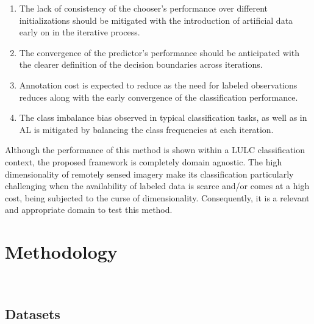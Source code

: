 \documentclass[parskip=full]{scrartcl}
\begin{document}
\begin{enumerate}
    \item The lack of consistency of the chooser's performance over different initializations should
        be mitigated with the introduction of artificial data early on in the iterative process.
    \item The convergence of the predictor's performance should be anticipated with the clearer
        definition of the decision boundaries across iterations.
    \item Annotation cost is expected to reduce as the need for labeled observations reduces along
        with the early convergence of the classification performance.
    \item The class imbalance bias observed in typical classification tasks, as well as in AL is
        mitigated by balancing the class frequencies at each iteration.
\end{enumerate}

Although the performance of this method is shown within a LULC classification context, the proposed
framework is completely domain agnostic. The high dimensionality of remotely sensed imagery make its
classification particularly challenging when the availability of labeled data is scarce and/or comes
at a high cost, being subjected to the curse of dimensionality. Consequently, it is a relevant and
appropriate domain to test this method.

\section{Methodology}~\label{sec:methodology}

\subsection{Datasets}

\end{document}
